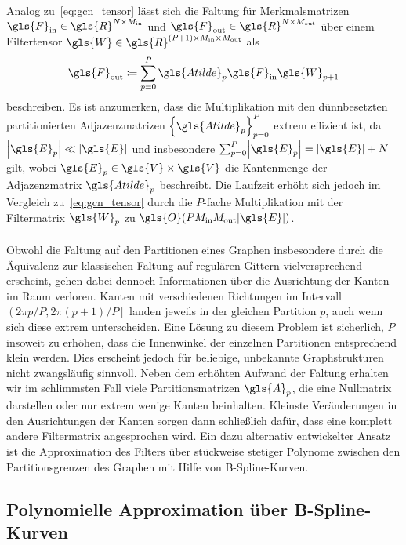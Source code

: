 Analog zu~\eqref{eq:gcn_tensor} lässt sich die Faltung für Merkmalsmatrizen $\gls{F}_{\mathrm{in}} \in \gls{R}^{N \times M_{\mathrm{in}}}$ und $\gls{F}_{\mathrm{out}} \in \gls{R}^{N \times M_{\mathrm{out}}}$ über einem Filtertensor $\gls{W} \in \gls{R}^{\left(P+1\right) \times M_{\mathrm{in}} \times M_{\mathrm{out}}}$ als
\begin{equation*}
  \gls{F}_{\mathrm{out}} \coloneqq \sum_{p=0}^P \gls{Atilde}_p\gls{F}_{\mathrm{in}}\gls{W}_{p+1}
\end{equation*}
beschreiben.
Es ist anzumerken, dass die Multiplikation mit den dünnbesetzten partitionierten Adjazenzmatrizen ${\left\{\gls{Atilde}_p\right\}}_{p=0}^P$ extrem effizient ist, da $\left|\gls{E}_p\right| \ll \left|\gls{E}\right|$ und insbesondere $\sum_{p=0}^P \left|\gls{E}_p\right| = \left|\gls{E}\right| + N$ gilt, wobei $\gls{E}_p \in \gls{V} \times \gls{V}$ die Kantenmenge der Adjazenzmatrix $\gls{Atilde}_p$ beschreibt.
Die Laufzeit erhöht sich jedoch im Vergleich zu~\eqref{eq:gcn_tensor} durch die $P$-fache Multiplikation mit der Filtermatrix $\gls{W}_p$ zu $\gls{O}\left(PM_{\mathrm{in}}M_{\mathrm{out}}\left|\gls{E}\right|\right)$.
\\\\
Obwohl die Faltung auf den Partitionen eines Graphen insbesondere durch die Äquivalenz zur klassischen Faltung auf regulären Gittern vielversprechend erscheint, gehen dabei dennoch Informationen über die Ausrichtung der Kanten im Raum verloren.
Kanten mit verschiedenen Richtungen im Intervall $\left(2\pi p/P, 2\pi \left(p+1\right)/P\right]$ landen jeweils in der gleichen Partition $p$, auch wenn sich diese \evtl{} extrem unterscheiden.
Eine Lösung zu diesem Problem ist sicherlich, $P$ insoweit zu erhöhen, dass die Innenwinkel der einzelnen Partitionen entsprechend klein werden.
Dies erscheint jedoch für beliebige, unbekannte Graphstrukturen nicht zwangsläufig sinnvoll.
Neben dem erhöhten Aufwand der Faltung erhalten wir im schlimmsten Fall viele Partitionsmatrizen $\gls{A}_p$, die eine Nullmatrix  darstellen oder nur extrem wenige Kanten beinhalten.
Kleinste Veränderungen in den Ausrichtungen der Kanten sorgen dann schließlich dafür, dass eine komplett andere Filtermatrix angesprochen wird.
Ein dazu alternativ entwickelter Ansatz ist die Approximation des Filters über stückweise stetiger Polynome zwischen den Partitionsgrenzen des Graphen mit Hilfe von B-Spline-Kurven.

\subsection{Polynomielle Approximation über B-Spline-Kurven}
\label{bspline}

